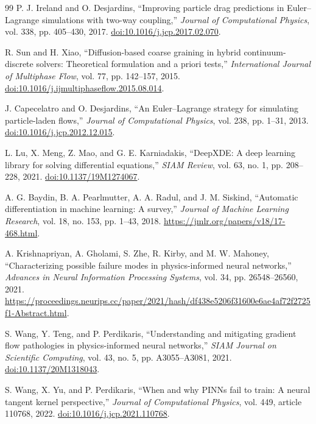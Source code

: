 \begin{thebibliography}{99}
P. J. Ireland and O. Desjardins, ``Improving particle drag predictions in
Euler--Lagrange simulations with two-way coupling,'' \emph{Journal of
Computational Physics}, vol. 338, pp. 405--430, 2017.
\href{https://doi.org/10.1016/j.jcp.2017.02.070}{doi:10.1016/j.jcp.2017.02.070}.

R. Sun and H. Xiao, ``Diffusion-based coarse graining in hybrid
continuum-discrete solvers: Theoretical formulation and a priori tests,''
\emph{International Journal of Multiphase Flow}, vol. 77, pp. 142--157, 2015.
\href{https://doi.org/10.1016/j.ijmultiphaseflow.2015.08.014}{doi:10.1016/j.ijmultiphaseflow.2015.08.014}.

J. Capecelatro and O. Desjardins, ``An Euler--Lagrange strategy for
simulating particle-laden flows,'' \emph{Journal of Computational
Physics}, vol. 238, pp. 1--31, 2013.
\href{https://doi.org/10.1016/j.jcp.2012.12.015}{doi:10.1016/j.jcp.2012.12.015}.

L. Lu, X. Meng, Z. Mao, and G. E. Karniadakis, ``DeepXDE: A deep learning
library for solving differential equations,'' \emph{SIAM Review}, vol. 63,
no. 1, pp. 208--228, 2021.
\href{https://doi.org/10.1137/19M1274067}{doi:10.1137/19M1274067}.

A. G. Baydin, B. A. Pearlmutter, A. A. Radul, and J. M. Siskind,
``Automatic differentiation in machine learning: A survey,'' \emph{Journal
of Machine Learning Research}, vol. 18, no. 153, pp. 1--43, 2018.
\url{https://jmlr.org/papers/v18/17-468.html}.

A. Krishnapriyan, A. Gholami, S. Zhe, R. Kirby, and M. W. Mahoney,
``Characterizing possible failure modes in physics-informed neural
networks,'' \emph{Advances in Neural Information Processing Systems},
vol. 34, pp. 26548--26560, 2021.
\url{https://proceedings.neurips.cc/paper/2021/hash/df438e5206f31600e6ae4af72f2725f1-Abstract.html}.

S. Wang, Y. Teng, and P. Perdikaris, ``Understanding and mitigating gradient
flow pathologies in physics-informed neural networks,'' \emph{SIAM Journal
on Scientific Computing}, vol. 43, no. 5, pp. A3055--A3081, 2021.
\href{https://doi.org/10.1137/20M1318043}{doi:10.1137/20M1318043}.

S. Wang, X. Yu, and P. Perdikaris, ``When and why PINNs fail to train:
A neural tangent kernel perspective,'' \emph{Journal of Computational
Physics}, vol. 449, article 110768, 2022.
\href{https://doi.org/10.1016/j.jcp.2021.110768}{doi:10.1016/j.jcp.2021.110768}.


\end{thebibliography}
